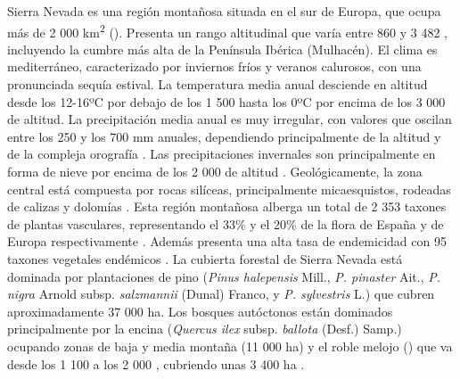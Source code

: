 Sierra Nevada es una región montañosa situada en el sur de Europa, que ocupa más de 2 000 km\textsuperscript{2} (). Presenta un rango altitudinal que varía entre 860 y 3 482 \elev, incluyendo la cumbre más alta de la Península Ibérica (Mulhacén). El clima es mediterráneo, caracterizado por inviernos fríos y veranos calurosos, con una pronunciada sequía estival. La temperatura media anual desciende en altitud desde los 12-16ºC por debajo de los 1 500 \elev hasta los 0ºC por encima de los 3 000 \elev de altitud. La precipitación media anual es muy irregular, con valores que oscilan entre los 250 y los 700 mm anuales, dependiendo  principalmente de la altitud y de la compleja orografía \autocites{PeinoCalero2020AnalisisVariabilidad, PerezLuqueetal2021ClimaNevadaBase}. Las precipitaciones invernales son principalmente en forma de nieve por encima de los 2 000 \elev de altitud \autocite{PerezPalazonetal2015ExtremeValues}. Geológicamente, la zona central está compuesta por rocas silíceas, principalmente micaesquistos, rodeadas de calizas y dolomías \autocite{RodriguezFernandez2017ParqueNacional}. Esta región montañosa alberga un total de 2 353 taxones de plantas vasculares, representando el 33\% y el 20\% de la flora de España y de Europa respectivamente \autocite{Lorite2016UpdatedChecklist}. Además presenta una alta tasa de endemicidad con 95 taxones vegetales endémicos \autocites{Loriteetal2007EstimationThreatened,Loriteetal2020FloraSNevadaTrait}. La cubierta forestal de Sierra Nevada está dominada por plantaciones de pino (\emph{Pinus halepensis} Mill., \emph{P. pinaster} Ait., \emph{P. nigra} Arnold subsp. \emph{salzmannii} (Dunal) Franco, y \emph{P. sylvestris} L.) que cubren aproximadamente 37 000 ha. Los bosques autóctonos están dominados principalmente por la encina (\emph{Quercus ilex} subsp. \emph{ballota} (Desf.) Samp.) ocupando zonas de baja y media montaña (11 000 ha) y el roble melojo (\Qpw) que va desde los 1 100 a los 2 000 \elev, cubriendo unas 3 400 ha \autocites{Lorite2001VegetacionSierra, PerezLuqueetal2019MapEcosystems}.

